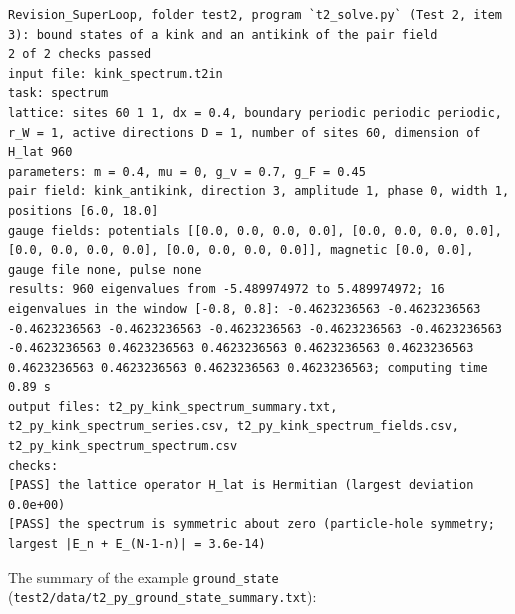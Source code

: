 \documentclass[
  10pt,
]{article}
\begin{document}
\begin{verbatim}
Revision_SuperLoop, folder test2, program `t2_solve.py` (Test 2, item 3): bound states of a kink and an antikink of the pair field
2 of 2 checks passed
input file: kink_spectrum.t2in
task: spectrum
lattice: sites 60 1 1, dx = 0.4, boundary periodic periodic periodic, r_W = 1, active directions D = 1, number of sites 60, dimension of H_lat 960
parameters: m = 0.4, mu = 0, g_v = 0.7, g_F = 0.45
pair field: kink_antikink, direction 3, amplitude 1, phase 0, width 1, positions [6.0, 18.0]
gauge fields: potentials [[0.0, 0.0, 0.0, 0.0], [0.0, 0.0, 0.0, 0.0], [0.0, 0.0, 0.0, 0.0], [0.0, 0.0, 0.0, 0.0]], magnetic [0.0, 0.0], gauge file none, pulse none
results: 960 eigenvalues from -5.489974972 to 5.489974972; 16 eigenvalues in the window [-0.8, 0.8]: -0.4623236563 -0.4623236563 -0.4623236563 -0.4623236563 -0.4623236563 -0.4623236563 -0.4623236563 -0.4623236563 0.4623236563 0.4623236563 0.4623236563 0.4623236563 0.4623236563 0.4623236563 0.4623236563 0.4623236563; computing time 0.89 s
output files: t2_py_kink_spectrum_summary.txt, t2_py_kink_spectrum_series.csv, t2_py_kink_spectrum_fields.csv, t2_py_kink_spectrum_spectrum.csv
checks:
[PASS] the lattice operator H_lat is Hermitian (largest deviation 0.0e+00)
[PASS] the spectrum is symmetric about zero (particle-hole symmetry; largest |E_n + E_(N-1-n)| = 3.6e-14)
\end{verbatim}

The summary of the example \texttt{ground\_state}
(\texttt{test2/data/t2\_py\_ground\_state\_summary.txt}):
\end{document}
